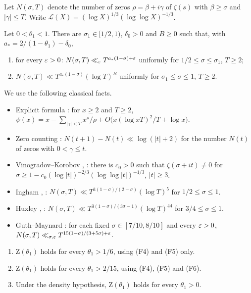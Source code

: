 Let $N(\sigma,T)$ denote the number of zeros $\rho=\beta+i\gamma$ of $\zeta(s)$ with $\beta\ge\sigma$ and
$|\gamma|\le T$. Write $\mathcal L(X)=(\log X)^{1/3}(\log\log X)^{-1/3}$.

\begin{hypothesis}\label{hyp:Z}
Let $0<\theta_1<1$. There are $\sigma_1\in[1/2,1)$, $\delta_0>0$ and $B\ge0$ such that, with
$a_*=2/(1-\theta_1)-\delta_0$,
\begin{enumerate}[label=\textup{(\alph*)}]
\item for every $\varepsilon>0$: $N(\sigma,T)\ll_\varepsilon T^{a_*(1-\sigma)+\varepsilon}$ uniformly for $1/2\le\sigma\le\sigma_1$, $T\ge2$;
\item $N(\sigma,T)\ll T^{a_*(1-\sigma)}(\log T)^B$ uniformly for $\sigma_1\le\sigma\le1$, $T\ge2$.
\end{enumerate}
\end{hypothesis}

We use the following classical facts.
\begin{itemize}[leftmargin=1.5em]
\item[(F1)] Explicit formula \cite[Ch.~17]{Dav00}: for $x\ge2$ and $T\ge2$,
$\psi(x)=x-\sum_{|\gamma|<T}x^\rho/\rho+O\bigl(x(\log xT)^2/T+\log x\bigr)$.
\item[(F2)] Zero counting \cite[Ch.~15]{Dav00}: $N(t+1)-N(t)\ll\log(|t|+2)$ for the number $N(t)$ of zeros with $0<\gamma\le t$.
\item[(F3)] Vinogradov--Korobov \cite[Thm.~6.1]{Ivi85}, \cite{Ford}: there is $c_0>0$ such that $\zeta(\sigma+it)\neq0$ for
$\sigma\ge1-c_0(\log|t|)^{-2/3}(\log\log|t|)^{-1/3}$, $|t|\ge3$.
\item[(F4)] Ingham \cite{Ing40}, \cite[Ch.~11]{Ivi85}: $N(\sigma,T)\ll T^{3(1-\sigma)/(2-\sigma)}(\log T)^5$ for $1/2\le\sigma\le1$.
\item[(F5)] Huxley \cite{Hux72}, \cite[Ch.~11]{Ivi85}: $N(\sigma,T)\ll T^{3(1-\sigma)/(3\sigma-1)}(\log T)^{44}$ for $3/4\le\sigma\le1$.
\item[(F6)] Guth--Maynard \cite{GM}: for each fixed $\sigma\in[7/10,8/10]$
and every $\varepsilon>0$, $N(\sigma,T)\ll_{\sigma,\varepsilon} T^{15(1-\sigma)/(3+5\sigma)+\varepsilon}$.
\end{itemize}

\begin{lemma}\label{lem:Z}
\begin{enumerate}[label=\textup{(\roman*)}]
\item $\mathrm Z(\theta_1)$ holds for every $\theta_1>1/6$, using \textup{(F4)} and \textup{(F5)} only.
\item $\mathrm Z(\theta_1)$ holds for every $\theta_1>2/15$, using \textup{(F4)}, \textup{(F5)} and \textup{(F6)}.
\item Under the density hypothesis, $\mathrm Z(\theta_1)$ holds for every $\theta_1>0$.
\end{enumerate}
\end{lemma}

